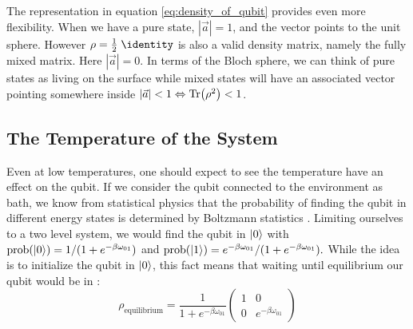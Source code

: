 The representation in equation \ref{eq:density_of_qubit} provides even more flexibility. When we have a pure state, $|\Vec{a}| = 1$, and the vector points to the unit sphere. However $\rho = \frac12 \; \identity$ is also a valid density matrix, namely the fully mixed matrix. Here $|\Vec{a}|=0$. In terms of the Bloch sphere, we can think of pure states as living on the surface while mixed states will have an associated vector pointing somewhere inside $|\Vec{a}|<1\Leftrightarrow \Tr(\rho^2) < 1$.

\subsection{The Temperature of the System}
Even at low temperatures, one should expect to see the temperature have an effect on the qubit. If we consider the qubit connected to the environment as bath, we know from statistical physics that the probability of finding the qubit in different energy states is determined by Boltzmann statistics \cite{boltzmann}. Limiting ourselves to a two level system, we would find the qubit in $\ket{0}$ with $\text{prob}(\ket{0}) = 1 / (1 + e^{-\beta\omega_{01}})$ and $\text{prob}(\ket{1}) = e^{-\beta\omega_{01}} / (1 + e^{-\beta\omega_{01}}).$ While the idea is to initialize the qubit in $\ket{0}$, this fact means that waiting until equilibrium our qubit would be in \cite{statphys?}:
\begin{equation}\label{eq:equilibrium_qubit_density_matrix}
    \rho_{\text{equilibrium}} = \frac{1}{1 + e^{-\beta\omega_{01}}}\begin{pmatrix}
        1 & 0 \\
        0 & e^{-\beta\omega_{01}}
    \end{pmatrix}
\end{equation}

